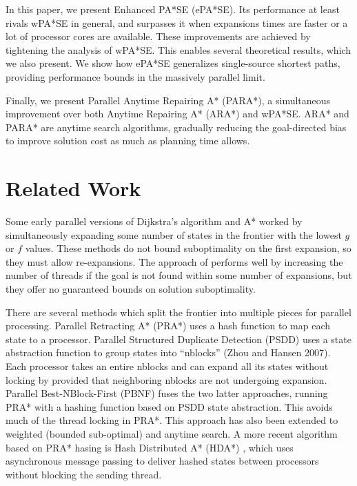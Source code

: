 \documentclass[letterpaper]{article}
\begin{document}
In this paper, we present Enhanced PA*SE (ePA*SE). Its performance at least rivals wPA*SE in general, and surpasses it when expansions times are faster or a lot of processor cores are available. These improvements are achieved by tightening the analysis of wPA*SE. This enables several theoretical results, which we also present. We show how ePA*SE generalizes single-source shortest paths, providing performance bounds in the massively parallel limit.

Finally, we present  Parallel Anytime Repairing A* (PARA*), a simultaneous improvement over both Anytime Repairing A* (ARA*) and wPA*SE. ARA* and PARA* are anytime search algorithms, gradually reducing the goal-directed bias to improve solution cost as much as planning time allows.

\section{Related Work}

Some early parallel versions of Dijkstra’s algorithm \cite{quinn86} and A* \cite{irani86} \cite{leifker85} worked by simultaneously expanding some number of states in the frontier with the lowest $g$ or $f$ values. These methods do not bound suboptimality on the first expansion, so they must allow re-expansions.
The approach of \cite{vidal10} performs well by increasing the number of threads if the goal is not found within some number of expansions, but they offer no guaranteed bounds on solution suboptimality.

There are several methods which split the frontier into multiple pieces for parallel processing.
Parallel Retracting A* (PRA*) \cite{evett95} uses a hash function to map each state to a processor.
Parallel Structured Duplicate Detection (PSDD) \cite{zhou07}
uses a state abstraction function to group states into
``nblocks” (Zhou and Hansen 2007).
Each processor takes an entire nblocks and can expand all its states without locking by provided
that neighboring nblocks are not undergoing expansion.
Parallel Best-NBlock-First (PBNF) \cite{burns_10} fuses the two latter
approaches, running PRA* with a hashing function
based on PSDD state abstraction.
This avoids much of the thread locking in PRA*.
This approach has also been extended to weighted (bounded
sub-optimal) and anytime search.
A more recent algorithm based on PRA* hasing is Hash Distributed A* (HDA*) \cite{kishimoto09},
which uses asynchronous message passing to deliver hashed states between processors without blocking the sending thread.
\end{document}
